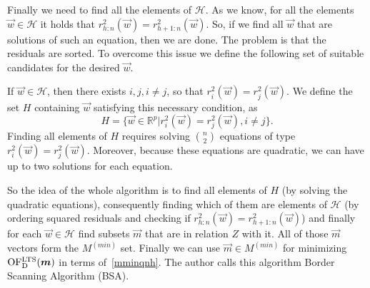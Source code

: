       


Finally we need to find all the elements of $\mathcal{H}$. As we know, for all the elements $\vec{w} \in \mathcal{H}$ it holds that $r^{2}_{h:n}(\vec{w}) = r^{2}_{h+1:n}(\vec{w})$. So, if we find all $\vec{w}$ that are solutions of such an equation, then we are done. The problem is that the residuals are sorted. To overcome this issue we define the following set of suitable candidates for the desired $\vec{w}$.


If $\vec{w} \in \mathcal{H}$, then there exists $i,j, i \neq j$, so that
    $r^{2}_i(\vec{w}) = r^{2}_j(\vec{w})$. We define the set $H$ containing $\vec{w}$ satisfying this necessary condition, as
\begin{equation}
    H = \{{ \vec{w} \in \mathbb{R}^p | r^{2}_i(\vec{w}) = r^{2}_j(\vec{w}), i \neq j  \}}.   
\end{equation}
Finding all elements of $H$ requires solving $\binom{n}{2}$ equations of type $r^{2}_i(\vec{w}) = r^{2}_j(\vec{w})$. Moreover, because these equations are quadratic, we can have up to two solutions for each equation.

So the idea of the whole algorithm is to find all elements of $H$ (by solving the quadratic equations), consequently finding which of them are elements of $\mathcal{H}$ (by ordering squared residuals and checking if $r^{2}_{h:n}(\vec{w}) = r^{2}_{h+1:n}(\vec{w})$) and finally for each $\vec{w} \in \mathcal{H}$ find subsets $\vec{m}$ that are in relation $Z$ with it. All of those $\vec{m}$ vectors form the $M^{(min)}$ set. Finally we can use $\vec{m} \in M^{(min)}$ for minimizing $\operatorname{OF^{LTS}_D}(\boldsymbol{m})$ in terms of~\eqref{mminqnh}. The author calls this algorithm Border Scanning Algorithm (BSA).

